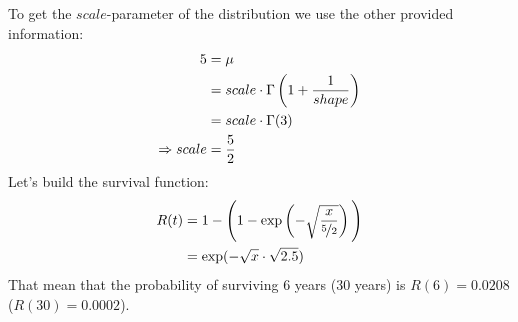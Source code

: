 \documentclass[british,a4paper,order=firstname]{mathscript}
\begin{document}
To get the $scale$-parameter of the distribution we use the other provided information:
\begin{align}
	5 &= \mu \notag \\
	&= scale\cdot\Gamma\left(1+\frac{1}{shape}\right) \notag \\
	&= scale\cdot\Gamma(3) \notag \\
	\Rightarrow scale &= \frac{5}{2} \notag
\end{align}
Let's build the survival function:
\begin{align}
	R(t) &= 1-\Bigg(1-\exp\left(-\sqrt{\frac{x}{\nicefrac{5}{2}}}\right)\Bigg) \notag \\
	&= \exp(-\sqrt{x}\cdot\sqrt{2.5})\notag
\end{align}
That mean that the probability of surviving 6 years (30 years) is $R(6) = 0.0208$ ($R(30) = 0.0002$).
\end{document}
